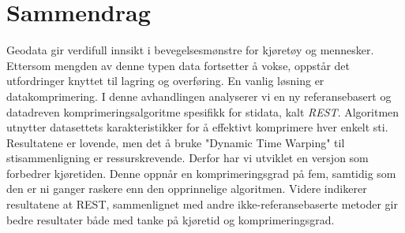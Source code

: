 \chapter*{Sammendrag}

Geodata gir verdifull innsikt i bevegelsesmønstre for kjøretøy og mennesker. Ettersom mengden av denne typen data fortsetter å vokse, oppstår det utfordringer knyttet til lagring og overføring. En vanlig løsning er datakomprimering. I denne avhandlingen analyserer vi en ny referansebasert og datadreven komprimeringsalgoritme spesifikk for stidata, kalt \textit{REST}. Algoritmen utnytter datasettets karakteristikker for å effektivt komprimere hver enkelt sti. Resultatene er lovende, men det å bruke "Dynamic Time Warping" til stisammenligning er ressurskrevende. Derfor har vi utviklet en versjon som forbedrer kjøretiden. Denne oppnår en komprimeringsgrad på fem, samtidig som den er ni ganger raskere enn den opprinnelige algoritmen. Videre indikerer resultatene at REST, sammenlignet med andre ikke-referansebaserte metoder gir bedre resultater både med tanke på kjøretid og komprimeringsgrad.
